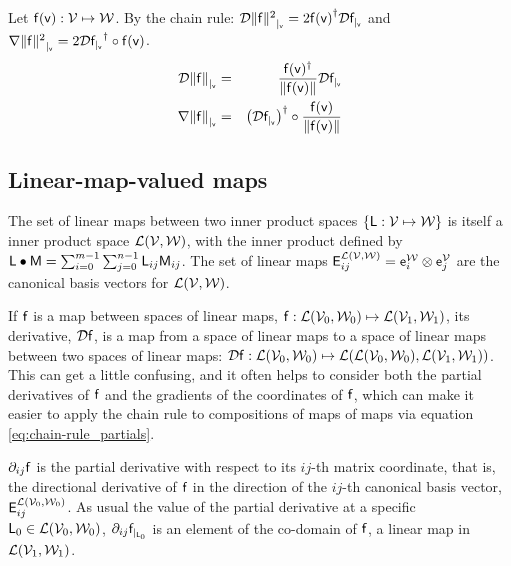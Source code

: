 Let $\mathsf{f}(\mathsf{v}) : \mathcal{V} \mapsto \mathcal{W}$.
By the chain rule:
${\mathcal{D}{\| \mathsf{f} \|^2}_{\mid_{\mathsf{v}}}}  =  2 {\mathsf{f}(\mathsf{v})}^{\dagger} {\mathcal{D}{\mathsf{f}}_{\mid_{\mathsf{v}}}} $
and
${\mathbf \nabla}{\| \mathsf{f} \|^2}_{\mid_{\mathsf{v}}}  =  2 {\mathcal{D}{\mathsf{f}}_{\mid_{\mathsf{v}}}}^\dagger \circ \mathsf{f}(\mathsf{v})$.
\begin{eqnarray}
\label{eq:norm_derivative}
{\mathcal{D}{\| \mathsf{f}\|}_{\mid_{\mathsf{v}}}}
& = &
\frac{\mathsf{f}(\mathsf{v})^\dagger}{\| \mathsf{f}(\mathsf{v}) \|} {\mathcal{D}{\mathsf{f}}_{\mid_{\mathsf{v}}}}  \\
{\mathbf \nabla}{\| \mathsf{f} \|}_{\mid_{\mathsf{v}}}
& = &
\left({\mathcal{D}{\mathsf{f}}_{\mid_{\mathsf{v}}}}\right)^\dagger \circ  \frac{\mathsf{f}(\mathsf{v})}{ \| \mathsf{f}(\mathsf{v})  \|}
\label{eq:norm_gradient}
\end{eqnarray}


\subsection{Linear-map-valued maps}
\label{sec:Linear-map-valued-maps}

The set of linear maps between two inner product spaces
$\{ \mathsf{L} : \mathcal{V} \mapsto \mathcal{W} \}$
is itself a inner product space $\mathcal{L}(\mathcal{V},\mathcal{W})$,
with the inner product defined by
$\mathsf{L} \bullet \mathsf{M} = \sum_{i=0}^{m-1} \sum_{j=0}^{n-1} \mathsf{L}_{ij} \mathsf{M}_{ij}$.
The set of linear maps
$\mathsf{E}_{ij}^{\mathcal{L}(\mathcal{V},\mathcal{W})}  = \mathsf{e}_i^{\mathcal{W}} \otimes \mathsf{e}_j^{\mathcal{V}}$
are the canonical basis vectors for $\mathcal{L}(\mathcal{V},\mathcal{W})$.

If $\mathsf{f}$ is a map between spaces of linear maps,
$\mathsf{f} : \mathcal{L}(\mathcal{V}_0,\mathcal{W}_0) \mapsto \mathcal{L}(\mathcal{V}_1,\mathcal{W}_1)$,
its derivative, ${\mathcal{D}{\mathsf{f}}}$,
is a map from a space of linear maps
to a space of linear maps between two
spaces of linear maps:
${\mathcal{D}{\mathsf{f}}} : \mathcal{L}(\mathcal{V}_0,\mathcal{W}_0) \mapsto
\mathcal{L}(\mathcal{L}(\mathcal{V}_0,\mathcal{W}_0), \mathcal{L}(\mathcal{V}_1,\mathcal{W}_1))$.
This can get a little confusing,
and it often helps to consider both the partial derivatives of $\mathsf{f}$
and the gradients of the coordinates of $\mathsf{f}$,
which can make it easier to apply the chain rule to
compositions of maps of maps via equation \ref{eq:chain-rule_partials}.

${\partial}_{ij}{\mathsf{f}}$ is the partial derivative with respect to its $ij$-th matrix coordinate,
that is, the directional derivative of $\mathsf{f}$ in the direction
of the $ij$-th canonical basis vector, $\mathsf{E}_{ij}^{\mathcal{L}(\mathcal{V}_0,\mathcal{W}_0)}$.
As usual the value of the partial derivative at a specific
$\mathsf{L}_0 \in  \mathcal{L}(\mathcal{V}_0,\mathcal{W}_0)$,
${\partial}_{ij}{\mathsf{f}}_{\mid_{\mathsf{L}_0}}$ is an element of the co-domain of $\mathsf{f}$,
a linear map in  $\mathcal{L}(\mathcal{V}_1,\mathcal{W}_1)$.

